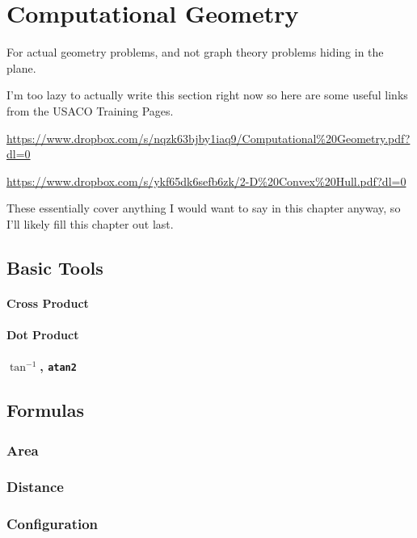 \chapter{Computational Geometry}

For actual geometry problems, and not graph theory problems hiding in the plane.

I'm too lazy to actually write this section right now so here are some useful links from the USACO Training Pages.

\url{https://www.dropbox.com/s/nqzk63bjby1iaq9/Computational\%20Geometry.pdf?dl=0}

\url{https://www.dropbox.com/s/ykf65dk6sefb6zk/2-D\%20Convex\%20Hull.pdf?dl=0}

These essentially cover anything I would want to say in this chapter anyway, so I'll likely fill this chapter out last.

\section{Basic Tools}

\subsubsection{Cross Product}

\subsubsection{Dot Product}

\subsubsection{$\tan^{-1}$, \texttt{atan2}}

\section{Formulas}

\subsection{Area}

\subsection{Distance}

\subsection{Configuration}

